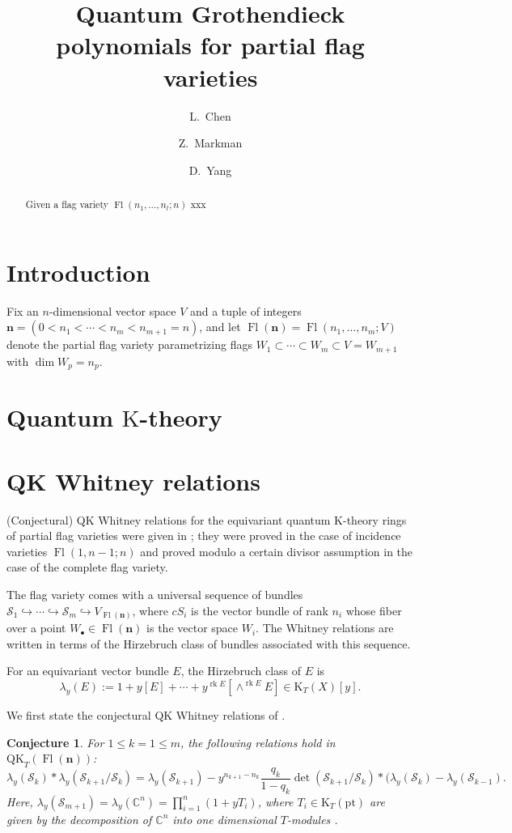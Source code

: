 \documentclass[12pt]{amsart}
\title[]{Quantum Grothendieck polynomials for partial flag varieties}
\author[L.~Chen]{L.~Chen}
\author[Z.~Markman]{Z.~Markman}
\author[D.~Yang]{D.~Yang}
\newtheorem{conjecture}[thm]{\bf Conjecture}
\theoremstyle{remark}
\newcommand{\CC}{\mathbb{C}}
\newcommand{\QK}{\mathrm{QK}}
\newcommand{\K}{\mathrm{K}}
\newcommand{\cS}{\mathcal{S}}
\newcommand{\nn}{\mathbf{n}}   %
\DeclareMathOperator{\Fl}{\mathrm{Fl}}
\DeclareMathOperator{\rk}{\mathrm{rk}}
\begin{document}
\begin{abstract}
Given a flag variety $\Fl(n_1,\ldots,n_l;n)$ xxx
\end{abstract}

\maketitle

\section{Introduction}\label{sec:intro}
Fix an $n$-dimensional vector space $V$ and a tuple of integers $\nn = (0<n_1<\cdots<n_m<n_{m+1}=n)$, and let $\Fl(\nn) = \Fl(n_1,\ldots,n_m;V)$ denote the partial flag variety parametrizing flags $W_1\subset \cdots \subset W_m \subset V = W_{m+1}$ with $\dim W_p = n_p$. 

\section{Quantum $\K$-theory}
 
 \section{QK Whitney relations}
 


(Conjectural) QK Whitney relations for the equivariant quantum K-theory rings of partial flag varieties were given in  \cite{gs1,gs2}; they were  proved in the case of incidence varieties $\Fl(1,n-1;n)$ and  proved modulo a certain divisor assumption in the case of the complete flag variety.

The flag variety comes with a universal sequence of  bundles $\cS_1\hookrightarrow \cdots \hookrightarrow \cS_m\hookrightarrow V_{\Fl(\nn)}$, where $cS_i$ is the vector bundle of rank $n_i$ whose fiber over a point $W_\bullet \in \Fl(\nn)$ is the vector space $W_i$.  The Whitney relations are written in terms of the Hirzebruch class of bundles associated with this sequence.

For an equivariant vector bundle $E$, the Hirzebruch class of $E$ is
$$\lambda_y(E):= 1+y[E]+\cdots + y^{\rk E} [\wedge^{\rk E}E] \in \K_T(X)[y].$$

We first state the conjectural QK Whitney relations of \cite[Conjecture 1.1]{gs2}.

\begin{conjecture}
\label{conj:whitney}
For $1\leq k=1\leq m$, the following relations hold in $\QK_T(\Fl(\nn))$:
\[
\lambda_y(\cS_k)*\lambda_y(\cS_{k+1}/\cS_k) = \lambda_y(\cS_{k+1}) - y^{n_{k+1}-n_k} \frac{q_k}{1-q_k}\det(\cS_{k+1}/\cS_k)*(\lambda_y(\cS_k)-\lambda_y(\cS_{k-1}).
\]
Here, $\lambda_y(\cS_{m+1})=\lambda_y(\CC^n) = \prod_{i=1}^n (1+yT_i)$, where $T_i\in\K_T(\mathrm{pt})$ are given by the decomposition of $\CC^n$ into one dimensional $T$-modules .
\end{conjecture}
\end{document}
